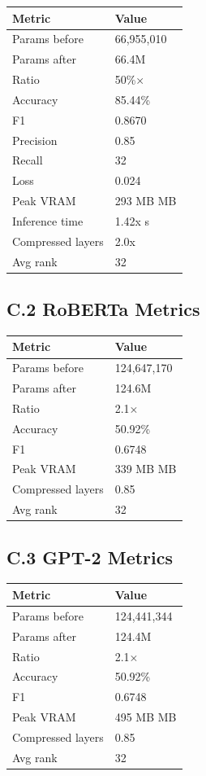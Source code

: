 \begin{table}[H]
\centering
\small
\begin{tabular}{ll}
\toprule
\textbf{Metric} & \textbf{Value} \\
\midrule
Params before & 66,955,010 \\
Params after & 66.4M \\
Ratio & 50\%$\times$ \\
Accuracy & 85.44\% \\
F1 & 0.8670 \\
Precision & 0.85 \\
Recall & 32 \\
Loss & 0.024 \\
Peak VRAM & 293 MB MB \\
Inference time & 1.42x s \\
Compressed layers & 2.0x \\
Avg rank & 32 \\
\bottomrule
\end{tabular}
\end{table}

\subsection{C.2 RoBERTa Metrics}

\begin{table}[H]
\centering
\small
\begin{tabular}{ll}
\toprule
\textbf{Metric} & \textbf{Value} \\
\midrule
Params before & 124,647,170 \\
Params after & 124.6M \\
Ratio & 2.1$\times$ \\
Accuracy & 50.92\% \\
F1 & 0.6748 \\
Peak VRAM & 339 MB MB \\
Compressed layers & 0.85 \\
Avg rank & 32 \\
\bottomrule
\end{tabular}
\end{table}

\subsection{C.3 GPT-2 Metrics}

\begin{table}[H]
\centering
\small
\begin{tabular}{ll}
\toprule
\textbf{Metric} & \textbf{Value} \\
\midrule
Params before & 124,441,344 \\
Params after & 124.4M \\
Ratio & 2.1$\times$ \\
Accuracy & 50.92\% \\
F1 & 0.6748 \\
Peak VRAM & 495 MB MB \\
Compressed layers & 0.85 \\
Avg rank & 32 \\
\bottomrule
\end{tabular}
\end{table}


